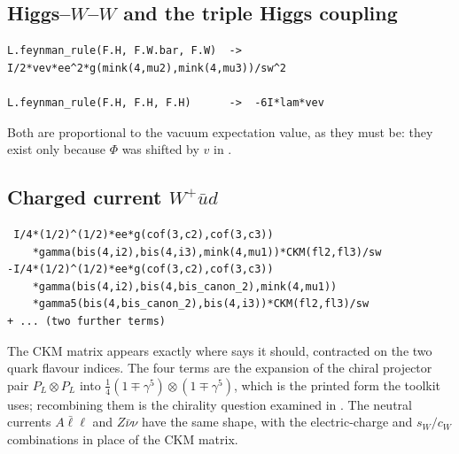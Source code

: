 \subsection*{Higgs--$W$--$W$ and the triple Higgs coupling}

\begin{verbatim}
L.feynman_rule(F.H, F.W.bar, F.W)  ->  I/2*vev*ee^2*g(mink(4,mu2),mink(4,mu3))/sw^2

L.feynman_rule(F.H, F.H, F.H)      ->  -6I*lam*vev
\end{verbatim}

\noindent Both are proportional to the vacuum expectation value, as they must
be: they exist only because $\Phi$ was shifted by $v$ in
.

\subsection*{Charged current $W^+ \bar u d$}

\begin{verbatim}
 I/4*(1/2)^(1/2)*ee*g(cof(3,c2),cof(3,c3))
    *gamma(bis(4,i2),bis(4,i3),mink(4,mu1))*CKM(fl2,fl3)/sw
-I/4*(1/2)^(1/2)*ee*g(cof(3,c2),cof(3,c3))
    *gamma(bis(4,i2),bis(4,bis_canon_2),mink(4,mu1))
    *gamma5(bis(4,bis_canon_2),bis(4,i3))*CKM(fl2,fl3)/sw
+ ... (two further terms)
\end{verbatim}

\noindent The CKM matrix appears exactly where
 says it should, contracted on the two quark flavour
indices. The four terms are the expansion of the chiral projector pair
$P_L \otimes P_L$ into $\tfrac14(1 \mp \gamma^5)\otimes(1\mp\gamma^5)$, which
is the printed form the toolkit uses; recombining them is the chirality
question examined in . The neutral currents
$A \bar\ell \ell$ and $Z \bar\nu \nu$ have the same shape, with the
electric-charge and $s_W/c_W$ combinations in place of the CKM matrix.
